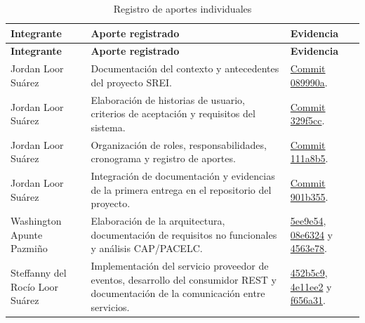 \begin{longtable}{P{0.20\textwidth} P{0.47\textwidth} P{0.23\textwidth}}
\caption{Registro de aportes individuales}\\
\toprule
\textbf{Integrante} & \textbf{Aporte registrado} & \textbf{Evidencia}\\
\midrule
\endfirsthead

\toprule
\textbf{Integrante} & \textbf{Aporte registrado} & \textbf{Evidencia}\\
\midrule
\endhead

Jordan Loor Suárez &
Documentación del contexto y antecedentes del proyecto SREI. &
\href{https://github.com/SteffannyLoorSuarez1/TA-PFC-E1-Proyecto-Fin-de-Curso/commit/089990a646f74fbf8632394452acd4430ec3ec85}{Commit 089990a}.\\

Jordan Loor Suárez &
Elaboración de historias de usuario, criterios de aceptación y requisitos del sistema. &
\href{https://github.com/SteffannyLoorSuarez1/TA-PFC-E1-Proyecto-Fin-de-Curso/commit/329f5cc1b3a2006748cf986d5bfaa1218a4eae89}{Commit 329f5cc}.\\

Jordan Loor Suárez &
Organización de roles, responsabilidades, cronograma y registro de aportes. &
\href{https://github.com/SteffannyLoorSuarez1/TA-PFC-E1-Proyecto-Fin-de-Curso/commit/111a8b591ef4a79c6f27f80bd40cd90a6ea4ab9c}{Commit 111a8b5}.\\

Jordan Loor Suárez &
Integración de documentación y evidencias de la primera entrega en el repositorio del proyecto. &
\href{https://github.com/SteffannyLoorSuarez1/TA-PFC-E1-Proyecto-Fin-de-Curso/commit/901b3555e577dc6a88ed7c943b501016eecbf953}{Commit 901b355}.\\

Washington Apunte Pazmiño &
Elaboración de la arquitectura, documentación de requisitos no funcionales y análisis CAP/PACELC. &
\href{https://github.com/SteffannyLoorSuarez1/TA-PFC-E1-Proyecto-Fin-de-Curso/commit/5ee9e54688b4601c0a2cdc60f61a7aa5d4bf81ed}{5ee9e54}, \href{https://github.com/SteffannyLoorSuarez1/TA-PFC-E1-Proyecto-Fin-de-Curso/commit/08e632437c965f425e4d23788129dea1c635c219}{08e6324} y \href{https://github.com/SteffannyLoorSuarez1/TA-PFC-E1-Proyecto-Fin-de-Curso/commit/4563e783a0f347cc584b85e8c7eb9600ccd36ccd}{4563e78}.\\

Steffanny del Rocío Loor Suárez &
Implementación del servicio proveedor de eventos, desarrollo del consumidor REST y documentación de la comunicación entre servicios. &
\href{https://github.com/SteffannyLoorSuarez1/TA-PFC-E1-Proyecto-Fin-de-Curso/commit/452b5c92bd3140cb8b60df574596899cd2a806c2}{452b5c9}, \href{https://github.com/SteffannyLoorSuarez1/TA-PFC-E1-Proyecto-Fin-de-Curso/commit/4e11ee27c15c0316584b6f205c48ad5a7e6da159}{4e11ee2} y \href{https://github.com/SteffannyLoorSuarez1/TA-PFC-E1-Proyecto-Fin-de-Curso/commit/f656a31bcf823141b154fbde2aef795424444889}{f656a31}.\\

\bottomrule
\end{longtable}

